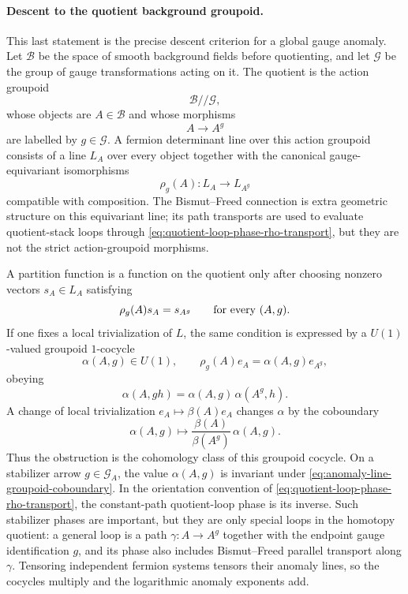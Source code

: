 \paragraph{Descent to the quotient background groupoid.}
This last statement is the precise descent criterion for a global gauge
anomaly.  Let \(\mathcal B\) be the space of smooth background fields before
quotienting, and let \(\mathcal G\) be the group of gauge transformations
acting on it.  The quotient is the action groupoid
\[
  \mathcal B//\mathcal G ,
\]
whose objects are \(A\in\mathcal B\) and whose morphisms
\[
  A\longrightarrow A^g
\]
are labelled by \(g\in\mathcal G\).  A fermion determinant line over this
action groupoid consists of a line \(L_A\) over every object together with
the canonical gauge-equivariant isomorphisms
\[
  \rho_g(A):L_A\longrightarrow L_{A^g}
\]
compatible with composition.  The Bismut--Freed connection is extra
geometric structure on this equivariant line; its path transports are used to
evaluate quotient-stack loops through
\eqref{eq:quotient-loop-phase-rho-transport}, but they are not the strict
action-groupoid morphisms.

A partition function is a function on the quotient only after choosing
nonzero vectors \(s_A\in L_A\) satisfying
\begin{equation}
  \rho_g(A)s_A=s_{A^g}
  \qquad\hbox{for every }(A,g).
  \label{eq:anomaly-line-equivariant-trivialization}
\end{equation}
If one fixes a local trivialization of \(L\), the same condition is expressed
by a \(U(1)\)-valued groupoid \(1\)-cocycle
\[
  \alpha(A,g)\in U(1),
  \qquad
  \rho_g(A)e_A=\alpha(A,g)e_{A^g},
\]
obeying
\begin{equation}
  \alpha(A,gh)=\alpha(A,g)\,\alpha(A^g,h).
  \label{eq:anomaly-line-groupoid-cocycle}
\end{equation}
A change of local trivialization \(e_A\mapsto\beta(A)e_A\) changes
\(\alpha\) by the coboundary
\begin{equation}
  \alpha(A,g)\longmapsto
  \frac{\beta(A)}{\beta(A^g)}\,\alpha(A,g).
  \label{eq:anomaly-line-groupoid-coboundary}
\end{equation}
Thus the obstruction is the cohomology class of this groupoid cocycle.  On a
stabilizer arrow \(g\in\mathcal G_A\), the value \(\alpha(A,g)\) is
invariant under \eqref{eq:anomaly-line-groupoid-coboundary}.  In the
orientation convention of \eqref{eq:quotient-loop-phase-rho-transport}, the
constant-path quotient-loop phase is its inverse.  Such stabilizer phases are
important, but they are only special loops in the homotopy quotient: a
general loop is a path \(\gamma:A\to A^g\) together with the endpoint gauge
identification \(g\), and its phase also includes Bismut--Freed parallel
transport along \(\gamma\).  Tensoring independent fermion systems tensors
their anomaly lines, so the cocycles multiply and the logarithmic anomaly
exponents add.

